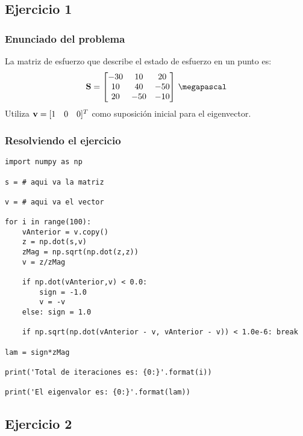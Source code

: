 \documentclass[12pt]{beamer}
\begin{document}
\subsection{Ejercicio 1}

\begin{frame}
\frametitle{Enunciado del problema}
La matriz de esfuerzo que describe el estado de esfuerzo en un punto es:
\pause
\renewcommand{\arraystretch}{1}
\begin{align*}
\vb{S} =
\begin{bmatrix}
- 30 & 10 & 20 \\
10 & 40 & -50 \\
20 & - 50 & -10
\end{bmatrix} \, \si{\megapascal}
\end{align*}
Utiliza $\vb{v} = [1 \quad 0 \quad 0]^{T}$ como suposición inicial para el eigenvector.
\end{frame}
\begin{frame}
\frametitle{Resolviendo el ejercicio}
\begin{lstlisting}[caption=Ejercicio para el método de la potencia]
import numpy as np

s = # aqui va la matriz

v = # aqui va el vector

for i in range(100):
    vAnterior = v.copy()
    z = np.dot(s,v)
    zMag = np.sqrt(np.dot(z,z))
    v = z/zMag
    
    if np.dot(vAnterior,v) < 0.0:
        sign = -1.0
        v = -v
    else: sign = 1.0
    
    if np.sqrt(np.dot(vAnterior - v, vAnterior - v)) < 1.0e-6: break

lam = sign*zMag

print('Total de iteraciones es: {0:}'.format(i))

print('El eigenvalor es: {0:}'.format(lam))
\end{lstlisting}
\end{frame}

\subsection{Ejercicio 2}
\end{document}
